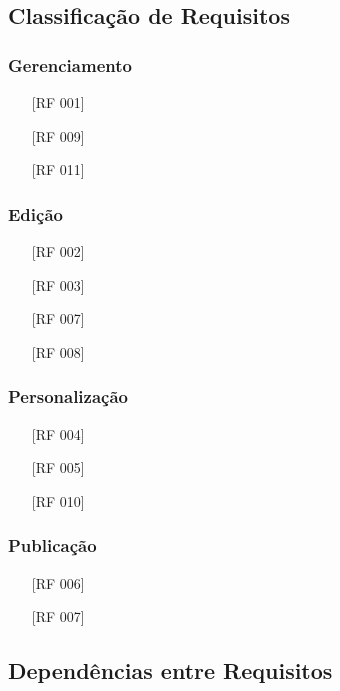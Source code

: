 \documentclass[ppginf, pep]{esinucpel}
\begin{document}
\subsection{Classificação de Requisitos}

\subsubsection{Gerenciamento}

\begin{itemize}
\item[\textbullet] [RF 001]
\item[\textbullet] [RF 009]
\item[\textbullet] [RF 011]
\end{itemize}

\subsubsection{Edição}

\begin{itemize}
\item[\textbullet] [RF 002]
\item[\textbullet] [RF 003]
\item[\textbullet] [RF 007]
\item[\textbullet] [RF 008]
\end{itemize}

\subsubsection{Personalização}

\begin{itemize}
\item[\textbullet] [RF 004]
\item[\textbullet] [RF 005]
\item[\textbullet] [RF 010]
\end{itemize}

\subsubsection{Publicação}

\begin{itemize}
\item[\textbullet] [RF 006]
\item[\textbullet] [RF 007]
\end{itemize}

\subsection{Dependências entre Requisitos}
\end{document}
